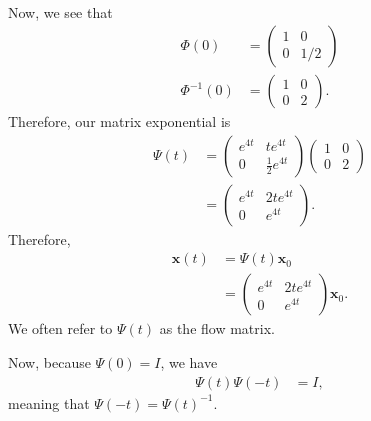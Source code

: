 \documentclass[10pt]{mypackage}
\begin{document}
\begin{example}
\begin{align*}
  \end{align*}
  Now, we see that
  \begin{align*}
    \Phi(0) &= \begin{pmatrix}1 & 0 \\ 0 & 1/2\end{pmatrix}\\
    \Phi^{-1}(0) &= \begin{pmatrix}1 & 0 \\ 0 & 2\end{pmatrix}.
  \end{align*}
  Therefore, our matrix exponential is
  \begin{align*}
    \Psi(t) &= \begin{pmatrix}e^{4t} & te^{4t} \\ 0 & \frac{1}{2}e^{4t}\end{pmatrix} \begin{pmatrix}1 & 0 \\ 0 & 2\end{pmatrix}\\
            &= \begin{pmatrix}e^{4t} & 2te^{4t} \\ 0 & e^{4t}\end{pmatrix}.
  \end{align*}
  Therefore,
  \begin{align*}
    \mathbf{x}(t) &= \Psi(t) \mathbf{x}_0\\
                  &= \begin{pmatrix}e^{4t} & 2te^{4t} \\ 0 & e^{4t}\end{pmatrix} \mathbf{x}_0.
  \end{align*}
  We often refer to $\Psi(t)$ as the flow matrix.\newline

  Now, because $\Psi(0) = I$, we have
  \begin{align*}
    \Psi\left( t \right)\Psi\left( -t \right) &= I,
  \end{align*}
  meaning that $\Psi\left( -t \right) = \Psi\left( t \right)^{-1}$.
\end{example}
\end{document}
